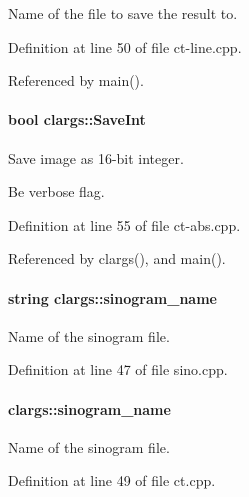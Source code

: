 Name of the file to save the result to. 



Definition at line 50 of file ct-\/line.cpp.



Referenced by main().

\hypertarget{structclargs_a30c46fe6f88e946e3a5840d7c4ca7531}{
\paragraph[{SaveInt}]{\setlength{\rightskip}{0pt plus 5cm}bool {\bf clargs::SaveInt}}\hfill}
\label{structclargs_a30c46fe6f88e946e3a5840d7c4ca7531}


Save image as 16-\/bit integer. 

Be verbose flag. 

Definition at line 55 of file ct-\/abs.cpp.



Referenced by clargs(), and main().

\hypertarget{structclargs_a2a13987ab1b5f2522e22dd75bd3b5b04}{
\paragraph[{sinogram\_\-name}]{\setlength{\rightskip}{0pt plus 5cm}string {\bf clargs::sinogram\_\-name}}\hfill}
\label{structclargs_a2a13987ab1b5f2522e22dd75bd3b5b04}


Name of the sinogram file. 



Definition at line 47 of file sino.cpp.

\hypertarget{structclargs_a5161f24147130f9f95c6fcdfce8d15a1}{
\paragraph[{sinogram\_\-name}]{ {\bf clargs::sinogram\_\-name}}\hfill}
\label{structclargs_a5161f24147130f9f95c6fcdfce8d15a1}


Name of the sinogram file. 



Definition at line 49 of file ct.cpp.



